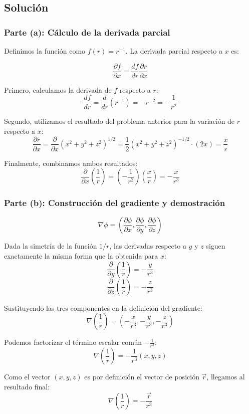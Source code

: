 \documentclass[12pt, letterpaper]{article}
\begin{document}
\subsection{Solución}

\subsubsection*{Parte (a): Cálculo de la derivada parcial}

Definimos la función como $f(r) = r^{-1}$. La derivada parcial respecto a $x$ es:

$$ \frac{\partial f}{\partial x} = \frac{df}{dr} \frac{\partial r}{\partial x} $$

Primero, calculamos la derivada de $f$ respecto a $r$:
$$ \frac{df}{dr} = \frac{d}{dr} (r^{-1}) = -r^{-2} = -\frac{1}{r^2} $$

Segundo, utilizamos el resultado del problema anterior para la variación de $r$ respecto a $x$:
$$ \frac{\partial r}{\partial x} = \frac{\partial}{\partial x} (x^2 + y^2 + z^2)^{1/2} = \frac{1}{2}(x^2 + y^2 + z^2)^{-1/2} \cdot (2x) = \frac{x}{r} $$

Finalmente, combinamos ambos resultados:
$$ \frac{\partial}{\partial x} \left( \frac{1}{r} \right) = \left( -\frac{1}{r^2} \right) \left( \frac{x}{r} \right) = -\frac{x}{r^3} $$

\subsubsection*{Parte (b): Construcción del gradiente y demostración}

$$ \nabla \phi = \left( \frac{\partial \phi}{\partial x}, \frac{\partial \phi}{\partial y}, \frac{\partial \phi}{\partial z} \right) $$

Dada la simetría de la función $1/r$, las derivadas respecto a $y$ y $z$ siguen exactamente la misma forma que la obtenida para $x$:
$$ \frac{\partial}{\partial y} \left( \frac{1}{r} \right) = -\frac{y}{r^3} $$
$$ \frac{\partial}{\partial z} \left( \frac{1}{r} \right) = -\frac{z}{r^3} $$


Sustituyendo las tres componentes en la definición del gradiente:
$$ \nabla \left( \frac{1}{r} \right) = \left( -\frac{x}{r^3}, -\frac{y}{r^3}, -\frac{z}{r^3} \right) $$

Podemos factorizar el término escalar común $-\frac{1}{r^3}$:
$$ \nabla \left( \frac{1}{r} \right) = -\frac{1}{r^3} (x, y, z) $$

Como el vector $(x, y, z)$ es por definición el vector de posición $\vec{r}$, llegamos al resultado final:
$$ \nabla \left( \frac{1}{r} \right) = -\frac{\vec{r}}{r^3} $$
\end{document}
